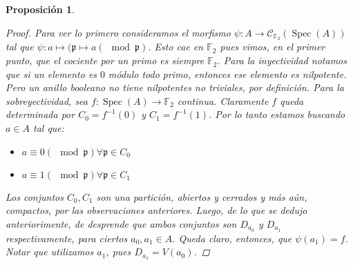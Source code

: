 \documentclass[11pt,a4paper, spanish,oneside,fleqn]{article}
\newtheorem{prop}[teo]{Proposición}
\theoremstyle{definition}
\newcommand{\FF}{\mathbb{F}}
\DeclareMathOperator{\spec}{Spec}
\begin{document}
\begin{prop}
\begin{proof}
Para ver lo primero consideramos el morfismo $\psi : A \to \mathscr{C}_{\FF_2}(\spec(A))$ tal que
$\psi : a\mapsto (\mathfrak{p}\mapsto a (\mod \mathfrak{p})$. Esto cae en $\FF_2$ pues vimos, en el primer punto, 
que el cociente por un primo es siempre $\FF_2$.
Para la inyectividad notamos que si un elemento es $0$ m\'odulo todo primo, entonces ese elemento es nilpotente.
Pero un anillo booleano no tiene nilpotentes no triviales, por definici\'on.
Para la sobreyectividad, sea $f : \spec(A) \to \FF_2$ continua. Claramente $f$ queda determinada por $C_0 = f^{-1}(0)$ y $C_1 = f^{-1}(1)$.
Por lo tanto estamos buscando $a\in A$ tal que:
\begin{itemize}
  \item $a\equiv 0 (\mod \mathfrak{p}) \forall \mathfrak{p} \in C_0$
  \item $a\equiv 1 (\mod \mathfrak{p}) \forall \mathfrak{p} \in C_1$
\end{itemize}
Los conjuntos $C_0,C_1$ son una partici\'on, abiertos y cerrados y m\'as a\'un, compactos, por las observaciones anteriores.
Luego, de lo que se dedujo anteriorimente, de desprende que ambos conjuntos son $D_{a_0}$ y $D_{a_1}$ respectivamente,
para ciertos $a_0,a_1\in A$.
Queda claro, entonces, que $\psi(a_1) = f$. Notar que utilizamos $a_1$, pues $D_{a_1} = V(a_0)$.


\end{proof}
\end{prop}
\end{document}
